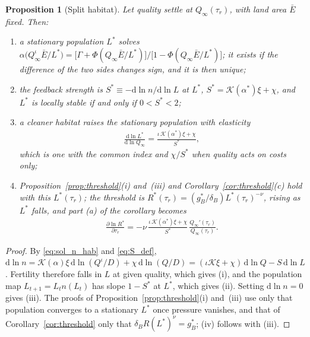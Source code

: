 \documentclass[11pt]{article}
\newtheorem{proposition}{Proposition}
\begin{document}
\begin{proposition}[Split habitat]
\label{prop:split}
Let quality settle at $Q_\infty(\tau_r)$, with land area $\bar E$ fixed. Then:
\begin{enumerate}
\item[(i)] a stationary population $L^\ast$ solves
$\alpha\big(Q_\infty^{\iota}\bar E/L^\ast\big)=\big[\Gamma+\Phi(Q_\infty\bar E/L^\ast)\big]/
\big[1-\Phi(Q_\infty\bar E/L^\ast)\big]$; it exists if the difference of the two sides changes sign, and it
is then unique;
\item[(ii)] the feedback strength is $S^\ast\equiv-\mathrm{d}\ln n/\mathrm{d}\ln L$ at $L^\ast$,
$S^\ast=\mathcal{K}(\alpha^\ast)\xi+\chi$, and $L^\ast$ is locally stable if and only if $0<S^\ast<2$;
\item[(iii)] a cleaner habitat raises the stationary population with elasticity
\begin{align}
\frac{\mathrm{d}\ln L^\ast}{\mathrm{d}\ln Q_\infty}=\frac{\iota\,\mathcal{K}(\alpha^\ast)\xi+\chi}{S^\ast},
\label{eq:dLdQ}
\end{align}
which is one with the common index and $\chi/S^\ast$ when quality acts on costs only;
\item[(iv)] Proposition~\ref{prop:threshold}(i) and~(iii) and Corollary~\ref{cor:threshold}(c) hold with this
$L^\ast(\tau_r)$; the threshold is $R^\ast(\tau_r)=(g_B^\ast/\delta_B)L^\ast(\tau_r)^{-\nu}$, rising as
$L^\ast$ falls, and part (a) of the corollary becomes
\begin{align*}
\frac{\partial\ln R^\ast}{\partial\tau_r}=-\nu\,\frac{\iota\,\mathcal{K}(\alpha^\ast)\xi+\chi}{S^\ast}\,
\frac{Q_\infty'(\tau_r)}{Q_\infty(\tau_r)}.
\end{align*}
\end{enumerate}
\end{proposition}

\begin{proof}
By \eqref{eq:sol_n_hab} and \eqref{eq:S_def}, $\mathrm{d}\ln n=\mathcal{K}(\alpha)\xi\,
\mathrm{d}\ln(Q^{\iota}/D)+\chi\,\mathrm{d}\ln(Q/D)=(\iota\mathcal{K}\xi+\chi)\,\mathrm{d}\ln Q-S\,\mathrm{d}\ln L$.
Fertility therefore falls in $L$ at given quality, which gives (i), and the population map
$L_{t+1}=L_tn(L_t)$ has slope $1-S^\ast$ at $L^\ast$, which gives (ii). Setting $\mathrm{d}\ln n=0$ gives (iii).
The proofs of Proposition~\ref{prop:threshold}(i) and~(iii) use only that population converges to a
stationary $L^\ast$ once pressure vanishes, and that of Corollary~\ref{cor:threshold} only that
$\delta_BR(L^\ast)^{\nu}=g_B^\ast$; (iv) follows with (iii).
\end{proof}
\end{document}
